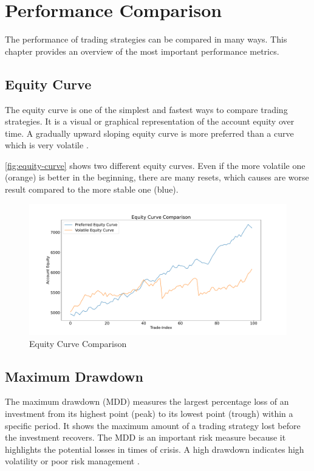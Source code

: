 \section{Performance Comparison}
\label{chap:performance}

The performance of trading strategies can be compared in many ways.
This chapter provides an overview of the most important performance metrics.

\subsection{Equity Curve}
\label{chap:equity-curve}

The equity curve is one of the simplest and fastest ways to compare trading strategies.
It is a visual or graphical representation of the account equity over time.
A gradually upward sloping equity curve is more preferred than a curve which is very volatile \cite{performace}.

\autoref{fig:equity-curve} shows two different equity curves.
Even if the more volatile one (orange) is better in the beginning, there are many resets, which causes are worse result compared to the more stable one (blue).

\begin{figure}[H]
    \centering
    \includegraphics[width=\textwidth]{images/trading-strategies/equity-curve}
    \caption{Equity Curve Comparison}
    \label{fig:equity-curve}
\end{figure}

\subsection{Maximum Drawdown}

The maximum drawdown (MDD) measures the largest percentage loss of an investment from its highest point (peak) to its lowest point (trough) within a specific period.
It shows the maximum amount of a trading strategy lost before the investment recovers.
The MDD is an important risk measure because it highlights the potential losses in times of crisis.
A high drawdown indicates high volatility or poor risk management \cite{mdd}.

